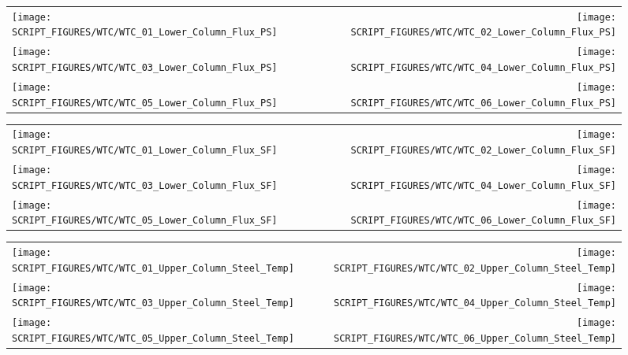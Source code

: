 \begin{figure}[p]
\begin{tabular*}{\textwidth}{l@{\extracolsep{\fill}}r}
\texttt{[image: SCRIPT\_FIGURES/WTC/WTC\_01\_Lower\_Column\_Flux\_PS]} &
\texttt{[image: SCRIPT\_FIGURES/WTC/WTC\_02\_Lower\_Column\_Flux\_PS]} \\
\texttt{[image: SCRIPT\_FIGURES/WTC/WTC\_03\_Lower\_Column\_Flux\_PS]} &
\texttt{[image: SCRIPT\_FIGURES/WTC/WTC\_04\_Lower\_Column\_Flux\_PS]} \\
\texttt{[image: SCRIPT\_FIGURES/WTC/WTC\_05\_Lower\_Column\_Flux\_PS]} &
\texttt{[image: SCRIPT\_FIGURES/WTC/WTC\_06\_Lower\_Column\_Flux\_PS]}
\end{tabular*}
\end{figure}

\begin{figure}[p]
\begin{tabular*}{\textwidth}{l@{\extracolsep{\fill}}r}
\texttt{[image: SCRIPT\_FIGURES/WTC/WTC\_01\_Lower\_Column\_Flux\_SF]} &
\texttt{[image: SCRIPT\_FIGURES/WTC/WTC\_02\_Lower\_Column\_Flux\_SF]} \\
\texttt{[image: SCRIPT\_FIGURES/WTC/WTC\_03\_Lower\_Column\_Flux\_SF]} &
\texttt{[image: SCRIPT\_FIGURES/WTC/WTC\_04\_Lower\_Column\_Flux\_SF]} \\
\texttt{[image: SCRIPT\_FIGURES/WTC/WTC\_05\_Lower\_Column\_Flux\_SF]} &
\texttt{[image: SCRIPT\_FIGURES/WTC/WTC\_06\_Lower\_Column\_Flux\_SF]}
\end{tabular*}
\end{figure}

\begin{figure}[p]
\begin{tabular*}{\textwidth}{l@{\extracolsep{\fill}}r}
\texttt{[image: SCRIPT\_FIGURES/WTC/WTC\_01\_Upper\_Column\_Steel\_Temp]} &
\texttt{[image: SCRIPT\_FIGURES/WTC/WTC\_02\_Upper\_Column\_Steel\_Temp]} \\
\texttt{[image: SCRIPT\_FIGURES/WTC/WTC\_03\_Upper\_Column\_Steel\_Temp]} &
\texttt{[image: SCRIPT\_FIGURES/WTC/WTC\_04\_Upper\_Column\_Steel\_Temp]} \\
\texttt{[image: SCRIPT\_FIGURES/WTC/WTC\_05\_Upper\_Column\_Steel\_Temp]} &
\texttt{[image: SCRIPT\_FIGURES/WTC/WTC\_06\_Upper\_Column\_Steel\_Temp]}
\end{tabular*}
\end{figure}

